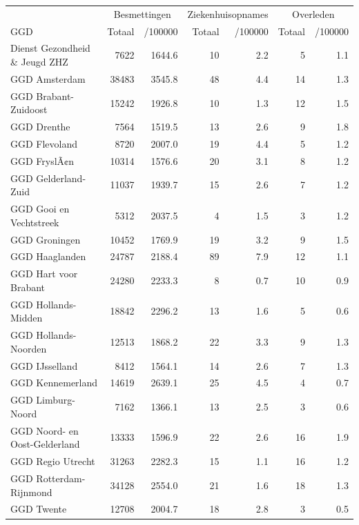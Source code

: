 \documentclass[
  english,
  man,floatsintext]{apa6}
\begin{document}
\begin{table}
\centering\begingroup\fontsize{10}{12}\selectfont

\begin{threeparttable}
\begin{tabular}{lrrrrrr}
\toprule
\multicolumn{1}{c}{ } & \multicolumn{2}{c}{Besmettingen} & \multicolumn{2}{c}{Ziekenhuisopnames} & \multicolumn{2}{c}{Overleden} \\
\cmidrule(l{3pt}r{3pt}){2-3} \cmidrule(l{3pt}r{3pt}){4-5} \cmidrule(l{3pt}r{3pt}){6-7}
GGD & Totaal & /100000 & Totaal & /100000 & Totaal & /100000\\
\midrule
Dienst Gezondheid \& Jeugd ZHZ & 7622 & 1644.6 & 10 & 2.2 & 5 & 1.1\\
GGD Amsterdam & 38483 & 3545.8 & 48 & 4.4 & 14 & 1.3\\
GGD Brabant-Zuidoost & 15242 & 1926.8 & 10 & 1.3 & 12 & 1.5\\
GGD Drenthe & 7564 & 1519.5 & 13 & 2.6 & 9 & 1.8\\
GGD Flevoland & 8720 & 2007.0 & 19 & 4.4 & 5 & 1.2\\
GGD FryslÃ¢n & 10314 & 1576.6 & 20 & 3.1 & 8 & 1.2\\
GGD Gelderland-Zuid & 11037 & 1939.7 & 15 & 2.6 & 7 & 1.2\\
GGD Gooi en Vechtstreek & 5312 & 2037.5 & 4 & 1.5 & 3 & 1.2\\
GGD Groningen & 10452 & 1769.9 & 19 & 3.2 & 9 & 1.5\\
GGD Haaglanden & 24787 & 2188.4 & 89 & 7.9 & 12 & 1.1\\
GGD Hart voor Brabant & 24280 & 2233.3 & 8 & 0.7 & 10 & 0.9\\
GGD Hollands-Midden & 18842 & 2296.2 & 13 & 1.6 & 5 & 0.6\\
GGD Hollands-Noorden & 12513 & 1868.2 & 22 & 3.3 & 9 & 1.3\\
GGD IJsselland & 8412 & 1564.1 & 14 & 2.6 & 7 & 1.3\\
GGD Kennemerland & 14619 & 2639.1 & 25 & 4.5 & 4 & 0.7\\
GGD Limburg-Noord & 7162 & 1366.1 & 13 & 2.5 & 3 & 0.6\\
GGD Noord- en Oost-Gelderland & 13333 & 1596.9 & 22 & 2.6 & 16 & 1.9\\
GGD Regio Utrecht & 31263 & 2282.3 & 15 & 1.1 & 16 & 1.2\\
GGD Rotterdam-Rijnmond & 34128 & 2554.0 & 21 & 1.6 & 18 & 1.3\\
GGD Twente & 12708 & 2004.7 & 18 & 2.8 & 3 & 0.5\\

\end{tabular}
\end{threeparttable}
\end{table}
\end{document}
